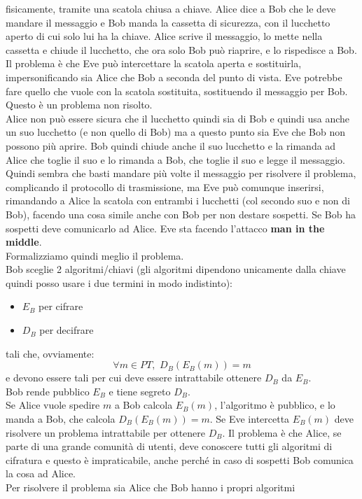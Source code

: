 \documentclass[a4paper,12pt, oneside]{book}
\begin{document}
fisicamente, tramite una scatola chiusa a chiave. Alice dice a Bob che le deve
mandare il messaggio e Bob manda la cassetta di sicurezza, con il lucchetto
aperto di cui solo lui ha la chiave. Alice scrive il messaggio, lo mette nella
cassetta e chiude il lucchetto, che ora solo Bob può riaprire, e lo rispedisce a
Bob. Il problema è che Eve può intercettare la scatola aperta e sostituirla,
impersonificando sia Alice che Bob a seconda del punto di vista. Eve potrebbe
fare quello che vuole con la scatola sostituita, sostituendo il messaggio per
Bob. Questo è un problema non risolto. \\
Alice non può essere sicura che il lucchetto quindi sia di Bob e quindi usa
anche un suo lucchetto (e non quello di Bob) ma a questo punto sia Eve che Bob
non possono più aprire. Bob quindi chiude anche il suo lucchetto e la rimanda ad
Alice che toglie il suo e lo rimanda a Bob, che toglie il suo e legge il
messaggio. Quindi sembra che basti mandare più volte il messaggio per risolvere
il problema, complicando il protocollo di trasmissione, ma Eve può comunque
inserirsi, rimandando a Alice la scatola con entrambi i lucchetti (col secondo
suo e non di Bob), facendo una cosa simile anche con Bob per non destare
sospetti. Se Bob ha sospetti deve comunicarlo ad Alice. Eve sta facendo
l'attacco \textbf{man in the middle}. \\ 
Formalizziamo quindi meglio il problema.\\
Bob sceglie 2 algoritmi/chiavi (gli algoritmi dipendono unicamente dalla chiave
quindi posso usare i due termini in modo indistinto):
\begin{itemize}
  \item $E_B$ per cifrare
  \item $D_B$ per decifrare
\end{itemize}
tali che, ovviamente:
\[\forall m\in PT,\,\,D_B(E_B(m))=m\]
e devono essere tali per cui deve essere intrattabile ottenere $D_B$ da $E_B$.\\
Bob rende pubblico $E_B$ e tiene segreto $D_B$.\\
Se Alice vuole spedire $m$ a Bob calcola $E_B(m)$, l'algoritmo è pubblico, e lo
manda a Bob, che calcola $D_B(E_B(m))=m$. Se Eve intercetta $E_B(m)$ deve
risolvere un problema intrattabile per ottenere $D_B$. Il problema è che Alice,
se parte di una grande comunità di utenti, deve conoscere tutti gli algoritmi di
cifratura e questo è impraticabile, anche perché in caso di sospetti Bob
comunica la cosa ad Alice.\\
Per risolvere il problema sia Alice che Bob hanno i propri algoritmi
\end{document}
